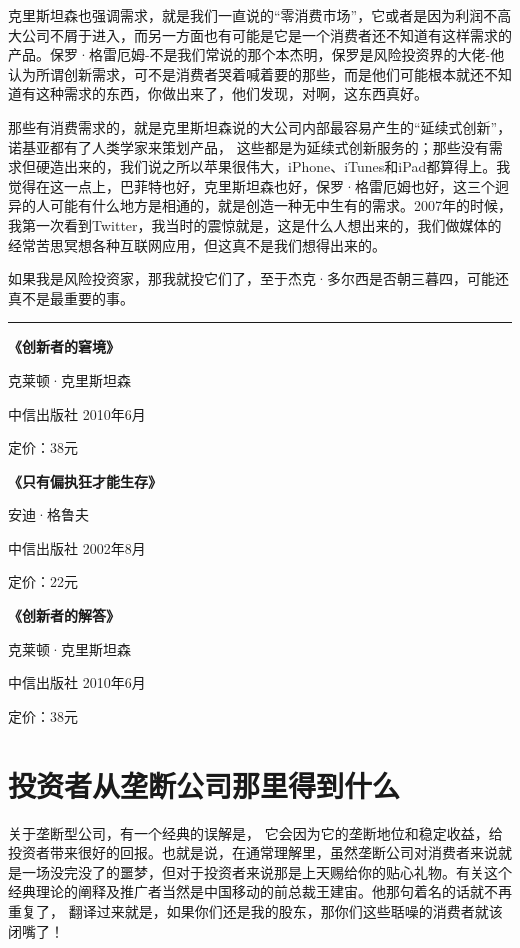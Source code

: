 克里斯坦森也强调需求，就是我们一直说的``零消费市场''，它或者是因为利润不高大公司不屑于进入，而另一方面也有可能是它是一个消费者还不知道有这样需求的产品。保罗·格雷厄姆-不是我们常说的那个本杰明，保罗是风险投资界的大佬-他认为所谓创新需求，可不是消费者哭着喊着要的那些，而是他们可能根本就还不知道有这种需求的东西，你做出来了，他们发现，对啊，这东西真好。

那些有消费需求的，就是克里斯坦森说的大公司内部最容易产生的``延续式创新''，诺基亚都有了人类学家来策划产品，
这些都是为延续式创新服务的；那些没有需求但硬造出来的，我们说之所以苹果很伟大，iPhone、iTunes和iPad都算得上。我觉得在这一点上，巴菲特也好，克里斯坦森也好，保罗·格雷厄姆也好，这三个迥异的人可能有什么地方是相通的，就是创造一种无中生有的需求。2007年的时候，我第一次看到Twitter，我当时的震惊就是，这是什么人想出来的，我们做媒体的经常苦思冥想各种互联网应用，但这真不是我们想得出来的。

如果我是风险投资家，那我就投它们了，至于杰克·多尔西是否朝三暮四，可能还真不是最重要的事。

\begin{center}\rule{0.5\linewidth}{0.5pt}\end{center}

\textbf{《创新者的窘境》}

克莱顿·克里斯坦森

中信出版社 2010年6月

定价：38元

\textbf{《只有偏执狂才能生存》}

安迪·格鲁夫

中信出版社 2002年8月

定价：22元

\textbf{《创新者的解答》}

克莱顿·克里斯坦森

中信出版社 2010年6月

定价：38元

\hypertarget{ux6295ux8d44ux8005ux4eceux5784ux65adux516cux53f8ux90a3ux91ccux5f97ux5230ux4ec0ux4e48}{%
\section{投资者从垄断公司那里得到什么}\label{ux6295ux8d44ux8005ux4eceux5784ux65adux516cux53f8ux90a3ux91ccux5f97ux5230ux4ec0ux4e48}}

关于垄断型公司，有一个经典的误解是，
它会因为它的垄断地位和稳定收益，给投资者带来很好的回报。也就是说，在通常理解里，虽然垄断公司对消费者来说就是一场没完没了的噩梦，但对于投资者来说那是上天赐给你的贴心礼物。有关这个经典理论的阐释及推广者当然是中国移动的前总裁王建宙。他那句着名的话就不再重复了，
翻译过来就是，如果你们还是我的股东，那你们这些聒噪的消费者就该闭嘴了！

